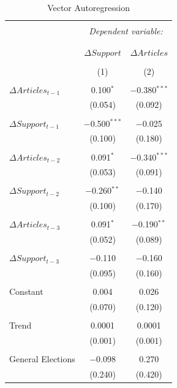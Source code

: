 \documentclass[12pt,]{article}
\begin{document}
\begin{table}[!htbp] \centering 
  \caption{Vector Autoregression} 
  \label{} 
\begin{tabular}{@{\extracolsep{5pt}}lcc} 
\\[-1.8ex]\hline 
\hline \\[-1.8ex] 
 & \multicolumn{2}{c}{\textit{Dependent variable:}} \\ 
\cline{2-3} 
\\[-1.8ex] & \multicolumn{2}{c}{} \\ 
 & $\Delta Support$ & $\Delta Articles$ \\ 
\\[-1.8ex] & (1) & (2)\\ 
\hline \\[-1.8ex] 
 $\Delta Articles_{t-1}$ & 0.100$^{*}$ & $-$0.380$^{***}$ \\ 
  & (0.054) & (0.092) \\ 
  & & \\ 
 $\Delta Support_{t-1}$ & $-$0.500$^{***}$ & $-$0.025 \\ 
  & (0.100) & (0.180) \\ 
  & & \\ 
 $\Delta Articles_{t-2}$ & 0.091$^{*}$ & $-$0.340$^{***}$ \\ 
  & (0.053) & (0.091) \\ 
  & & \\ 
 $\Delta Support_{t-2}$ & $-$0.260$^{**}$ & $-$0.140 \\ 
  & (0.100) & (0.170) \\ 
  & & \\ 
 $\Delta Articles_{t-3}$ & 0.091$^{*}$ & $-$0.190$^{**}$ \\ 
  & (0.052) & (0.089) \\ 
  & & \\ 
 $\Delta Support_{t-3}$ & $-$0.110 & $-$0.160 \\ 
  & (0.095) & (0.160) \\ 
  & & \\ 
 Constant & 0.004 & 0.026 \\ 
  & (0.070) & (0.120) \\ 
  & & \\ 
 Trend & 0.0001 & 0.0001 \\ 
  & (0.001) & (0.001) \\ 
  & & \\ 
 General Elections & $-$0.098 & 0.270 \\ 
  & (0.240) & (0.420) \\ 

\end{tabular}
\end{table}
\end{document}
